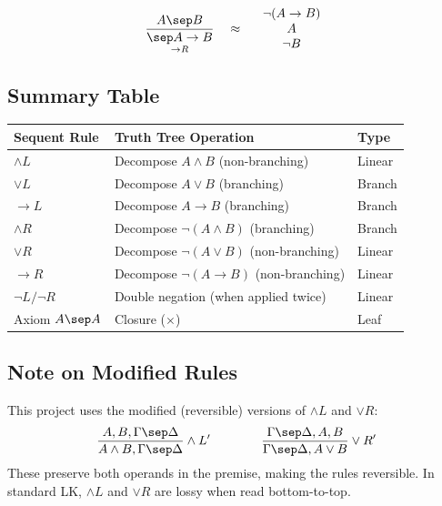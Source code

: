 \documentclass[12pt, letterpaper]{article}
\begin{document}
\[
\frac{A \sep B}{\underset{\to R}{\sep A \to B}}
\quad \approx \quad
\begin{array}{c} \neg(A \to B) \\ A \\ \neg B \end{array}
\]

\subsection*{Summary Table}

\begin{center}
\begin{tabular}{l|l|l}
\textbf{Sequent Rule} & \textbf{Truth Tree Operation} & \textbf{Type} \\
\hline
$\land L$ & Decompose $A \land B$ (non-branching) & Linear \\
$\lor L$ & Decompose $A \lor B$ (branching) & Branch \\
$\to L$ & Decompose $A \to B$ (branching) & Branch \\
$\land R$ & Decompose $\neg(A \land B)$ (branching) & Branch \\
$\lor R$ & Decompose $\neg(A \lor B)$ (non-branching) & Linear \\
$\to R$ & Decompose $\neg(A \to B)$ (non-branching) & Linear \\
$\neg L / \neg R$ & Double negation (when applied twice) & Linear \\
Axiom $A \sep A$ & Closure ($\times$) & Leaf \\
\end{tabular}
\end{center}

\subsection*{Note on Modified Rules}

This project uses the modified (reversible) versions of $\land L$ and $\lor R$:
\[
\frac{A, B, \Gamma \sep \Delta}{A \land B, \Gamma \sep \Delta} \land L'
\qquad \qquad
\frac{\Gamma \sep \Delta, A, B}{\Gamma \sep \Delta, A \lor B} \lor R'
\]
These preserve both operands in the premise, making the rules reversible. In standard LK, $\land L$ and $\lor R$ are lossy when read bottom-to-top.
\end{document}
